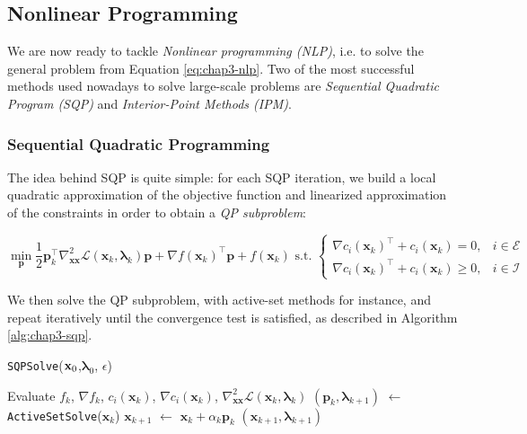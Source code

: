 \subsection{Nonlinear Programming}

We are now ready to tackle \emph{Nonlinear programming (NLP)}, i.e. to
solve the general problem from Equation \ref{eq:chap3-nlp}. Two of the
most successful methods used nowadays to solve large-scale problems
are \emph{Sequential Quadratic Program (SQP)} and \emph{Interior-Point
  Methods (IPM)}.

\subsubsection{Sequential Quadratic Programming}
\label{subsubsec:chap3-sqp}

The idea behind SQP is quite simple: for each SQP iteration, we build
a local quadratic approximation of the objective function and
linearized approximation of the constraints in order to obtain a
\emph{QP subproblem}:

\begin{equation}
\min_{\mathbf{p}}\frac{1}{2}\mathbf{p}_k^{\top}\nabla_{\mathbf{x}\mathbf{x}}^2\mathcal{L}(\mathbf{x}_k,\boldsymbol{\lambda}_k)\mathbf{p}+\nabla f(\mathbf{x}_k)^{\top}\mathbf{p}+f(\mathbf{x}_k)
\text{ s.t. }
\left\{\begin{array}{cc}
\nabla c_i(\mathbf{x}_k)^{\top}+c_i(\mathbf{x}_k) = 0, & i \in \mathcal{E} \\
\nabla c_i(\mathbf{x}_k)^{\top}+c_i(\mathbf{x}_k) \ge 0, & i \in \mathcal{I}
\end{array}\right.
\end{equation}

We then solve the QP subproblem, with active-set methods for instance,
and repeat iteratively until the convergence test is satisfied, as
described in Algorithm \ref{alg:chap3-sqp}.

\begin{algorithm}
\caption{\texttt{SQPSolve}($\mathbf{x}_0$,$\boldsymbol{\lambda}_0$, $\epsilon$)}
\label{alg:chap3-sqp}
\begin{algorithmic}
\STATE Evaluate $f_k$, $\nabla f_k$, $c_i(\mathbf{x}_k)$, $\nabla c_i(\mathbf{x}_k)$, $\nabla_{\mathbf{x}\mathbf{x}}^2\mathcal{L}(\mathbf{x}_k,\boldsymbol{\lambda}_k)$
\STATE $(\mathbf{p}_k, \boldsymbol{\lambda}_{k+1})$ $\leftarrow$ \texttt{ActiveSetSolve}($\mathbf{x}_k$)
\STATE $\mathbf{x}_{k+1}$ $\leftarrow$ $\mathbf{x}_k + \alpha_k\mathbf{p}_k$
\RETURN $(\mathbf{x}_{k+1},\boldsymbol{\lambda}_{k+1})$
\ENDIF
\ENDFOR
\end{algorithmic}
\end{algorithm}

